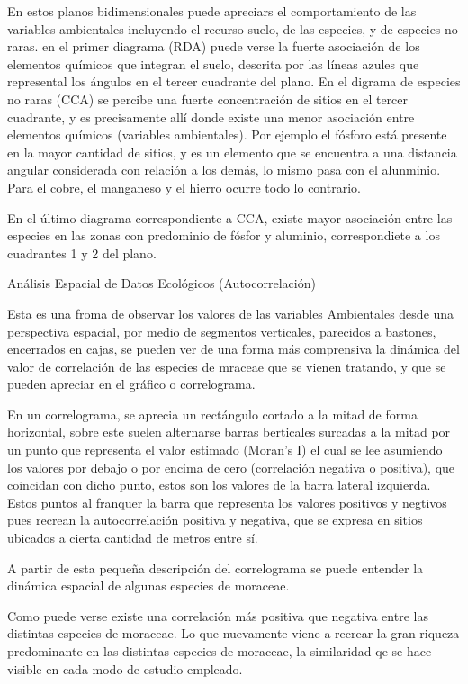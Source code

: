 \documentclass[11pt,]{article}
\begin{document}
En estos planos bidimensionales puede apreciars el comportamiento de las
variables ambientales incluyendo el recurso suelo, de las especies, y de
especies no raras. en el primer diagrama (RDA) puede verse la fuerte
asociación de los elementos químicos que integran el suelo, descrita por
las líneas azules que represental los ángulos en el tercer cuadrante del
plano. En el digrama de especies no raras (CCA) se percibe una fuerte
concentración de sitios en el tercer cuadrante, y es precisamente allí
donde existe una menor asociación entre elementos químicos (variables
ambientales). Por ejemplo el fósforo está presente en la mayor cantidad
de sitios, y es un elemento que se encuentra a una distancia angular
considerada con relación a los demás, lo mismo pasa con el alunminio.
Para el cobre, el manganeso y el hierro ocurre todo lo contrario.

En el último diagrama correspondiente a CCA, existe mayor asociación
entre las especies en las zonas con predominio de fósfor y aluminio,
correspondiete a los cuadrantes 1 y 2 del plano.

Análisis Espacial de Datos Ecológicos (Autocorrelación)

Esta es una froma de observar los valores de las variables Ambientales
desde una perspectiva espacial, por medio de segmentos verticales,
parecidos a bastones, encerrados en cajas, se pueden ver de una forma
más comprensiva la dinámica del valor de correlación de las especies de
mraceae que se vienen tratando, y que se pueden apreciar en el gráfico o
correlograma.

En un correlograma, se aprecia un rectángulo cortado a la mitad de forma
horizontal, sobre este suelen alternarse barras berticales surcadas a la
mitad por un punto que representa el valor estimado (Moran's I) el cual
se lee asumiendo los valores por debajo o por encima de cero
(correlación negativa o positiva), que coincidan con dicho punto, estos
son los valores de la barra lateral izquierda. Estos puntos al franquer
la barra que representa los valores positivos y negtivos pues recrean la
autocorrelación positiva y negativa, que se expresa en sitios ubicados a
cierta cantidad de metros entre sí.

A partir de esta pequeña descripción del correlograma se puede entender
la dinámica espacial de algunas especies de moraceae.

Como puede verse existe una correlación más positiva que negativa entre
las distintas especies de moraceae. Lo que nuevamente viene a recrear la
gran riqueza predominante en las distintas especies de moraceae, la
similaridad qe se hace visible en cada modo de estudio empleado.
\end{document}
